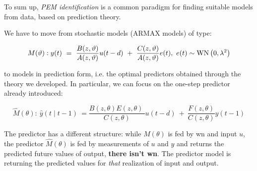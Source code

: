 
To sum up, \textit{PEM identification} is a common paradigm for finding suitable models from data, based on prediction theory.

We have to move from stochastic models (ARMAX models) of type: 

$$
M(\theta):
y(t) \ =\ \frac{B(z,\theta)}{A(z,\theta)} u(t-d) \ +\ \frac{C(z,\theta)}{A(z,\theta)} e(t) ,\ e(t)\sim \WN \left(0,\lambda ^{2}\right)
$$

to models in prediction form, i.e. the optimal predictors obtained through the theory we developed. In particular, we can focus on the one-step predictor already introduced:

$$
\hat{M}(\theta) :
\ \hat{y}(t\mid t-1) \ =\frac{B(z,\theta) E(z,\theta) \ }{C(z,\theta)} u(t-d) \ +\ \frac{F(z,\theta)}{C(z,\theta)} y(t-1)
$$

The predictor has a different structure: while $ M(\theta)$ is fed by \gls{wn} and input $u$, the predictor $\hat{M}(\theta)$ is fed by measurements of $u$ and $y$ and returns the predicted future values of output, \textbf{there isn't \gls{wn}}. The predictor model is returning the predicted values for \textit{that} realization of input and output.



